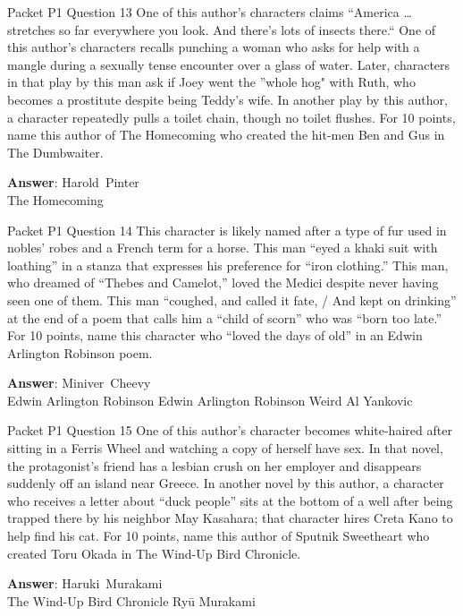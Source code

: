 \begin{frame}{Packet P1 Question 13}
One of this author's characters claims “America … stretches so far everywhere you look. And there's lots of insects there.`` One of this author's characters recalls punching a woman who asks for help with a mangle during a sexually tense encounter over a glass of water. Later, characters in that play by this man ask if Joey went the ''whole hog" with Ruth, who becomes a prostitute despite being Teddy's   wife. In another play by this author,   a character repeatedly pulls a toilet chain, though no toilet flushes. For 10 points, name this author of The Homecoming who created the hit-men   Ben and Gus in     The Dumbwaiter.

\textbf{Answer}: Harold\ Pinter\\
 The Homecoming
\end{frame}

\begin{frame}{Packet P1 Question 14}
This character is likely named after a type of fur used in nobles' robes and a French term for a horse. This man ``eyed a khaki suit with loathing'' in a stanza that expresses his preference for ``iron clothing.''   This man, who dreamed of ``Thebes and Camelot,'' loved   the Medici despite   never having seen one of them. This man ``coughed, and called   it fate, / And kept   on drinking'' at the end of a poem that calls him a ``child of scorn'' who was ``born too late.'' For 10 points, name this character who ``loved the days of old'' in an Edwin Arlington Robinson poem.  

\textbf{Answer}: Miniver\ Cheevy\\
 Edwin Arlington Robinson
 Edwin Arlington Robinson
 Weird Al Yankovic
\end{frame}

\begin{frame}{Packet P1 Question 15}
One of this author’s character becomes white-haired after sitting in a Ferris Wheel and watching a copy of herself have sex. In that novel, the protagonist’s friend has a lesbian crush on her employer and disappears suddenly off an island near Greece. In another novel by this author, a character who receives a letter about “duck people” sits at the bottom of a well after being trapped there by his neighbor May Kasahara; that character hires Creta Kano to help     find his cat. For 10 points, name this author of Sputnik Sweetheart who created   Toru Okada in The     Wind-Up Bird Chronicle.

\textbf{Answer}: Haruki\ Murakami\\
 The Wind-Up Bird Chronicle
 Ryū Murakami
\end{frame}

